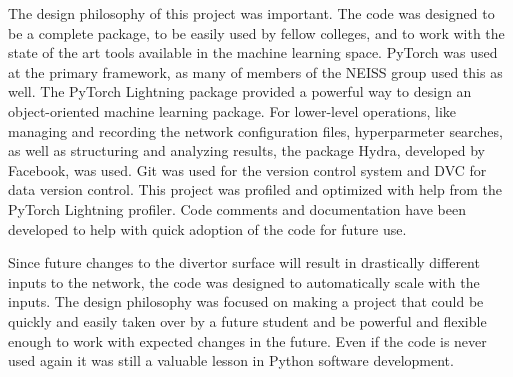 \label{sec:code:philosophy}
The design philosophy of this project was important. The code was designed to be a complete package, to be easily used by fellow colleges, and to work with the state of the art tools available in the machine learning space. PyTorch was used at the primary framework, as many of members of the NEISS group used this as well. The PyTorch Lightning package provided a powerful way to design an object-oriented machine learning package. For lower-level operations, like managing and recording the network configuration files, hyperparmeter searches, as well as structuring and analyzing results, the package Hydra, developed by Facebook, was used. Git was used for the version control system and DVC for data version control. This project was profiled and optimized with help from the PyTorch Lightning profiler. Code comments and documentation have been developed to help with quick adoption of the code for future use.

Since future changes to the divertor surface will result in drastically different inputs to the network, the code was designed to automatically scale with the inputs. The design philosophy was focused on making a project that could be quickly and easily taken over by a future student and be powerful and flexible enough to work with expected changes in the future. Even if the code is never used again it was still a valuable lesson in Python software development.










